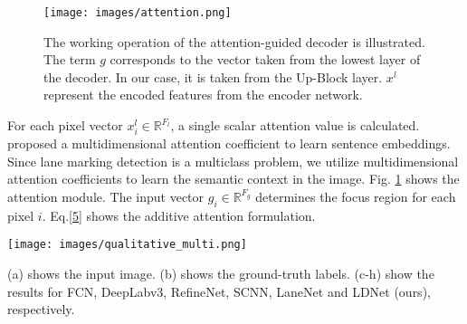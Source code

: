 \documentclass[journal]{IEEEtran}
\begin{document}
\begin{figure}[t]
\centering
\texttt{[image: images/attention.png]}
\caption{The working operation of the attention-guided decoder is illustrated. The term $g$ corresponds to the vector taken from the lowest layer of the decoder. In our case, it is taken from the Up-Block layer. $x^l$ represent the encoded features from the encoder network. }
\label{atten}
\end{figure}
For each pixel vector $x^l_i \in \mathbb{R}^{F_l}$, a single scalar attention value is calculated. \cite{a5} proposed a multidimensional attention coefficient to learn sentence embeddings. Since lane marking detection is a multiclass problem, we utilize multidimensional attention coefficients to learn the semantic context in the image. Fig. \ref{atten} shows the attention module. The input vector $g_i \in\mathbb{R}^{F_g}$ determines the focus region for each pixel $i$. Eq.\ref{5} shows the additive attention formulation.
\begin{figure*}[t]
      \centering
      \texttt{[image: images/qualitative\_multi.png]}
\caption{The qualitative comparison between different lane detection methods using multiclass labels. There are 5 classes: background, lane-1, lane-2, lane-3 and lane-4.} (a) shows the input image. (b) shows the ground-truth labels. (c-h) show the results for FCN, DeepLabv3, RefineNet, SCNN, LaneNet and LDNet (ours), respectively. 
      \label{multi-class}
\end{figure*}
\end{document}
